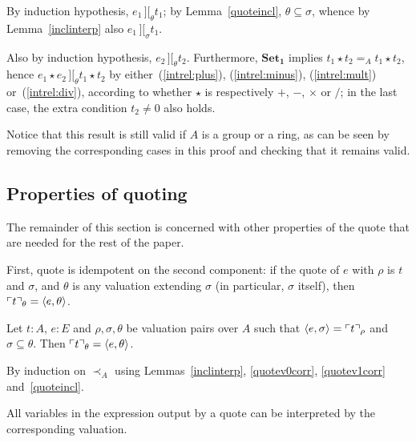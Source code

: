 \documentclass[numreferences]{kluwer}
\newcommand{\intII}{\,]\![}
\newcommand{\less}{\mathrel{\prec_A}}
\newcommand{\axiom}[1]{\ensuremath{\mathbf{#1}}}
\newcommand{\mlfn}[2]{\ensuremath\ulcorner{#1}\urcorner_{#2}}
\newcommand{\intrels}{\mathbin{\intII_{\sigma}}}
\newcommand{\intrelt}{\mathbin{\intII_{\theta}}}
\begin{document}
\begin{article}
\begin{pf}
\begin{enumerate}
By induction hypothesis, $e_1\intrelt t_1$; by Lemma~\ref{quoteincl},
$\theta\subseteq\sigma$, whence by Lemma~\ref{inclinterp} also
$e_1\intrels t_1$.

Also by induction hypothesis, $e_2\intrelt t_2$.  Furthermore,
\axiom{Set_1} implies $t_1\star t_2=_A t_1\star t_2$, hence $e_1\star
e_2\intrelt t_1\star t_2$ by either~(\ref{intrel:plus}),
(\ref{intrel:minus}), (\ref{intrel:mult}) or~(\ref{intrel:div}),
according to whether $\star$ is respectively $+$, $-$, $\times$ or
$/$; in the last case, the extra condition $t_2\neq 0$ also holds.
\end{enumerate}
\end{pf}

Notice that this result is still valid if $A$ is a group or
a ring, as can be seen by removing the corresponding cases in this proof
and checking that it remains valid.

\subsection{Properties of quoting}

The remainder of this section is concerned with other properties of
the quote that are needed for the rest of the paper.

First, quote is idempotent on the second component: if the quote of $e$ with
$\rho$ is $t$ and $\sigma$, and $\theta$ is any valuation extending
$\sigma$ (in particular, $\sigma$ itself), then
$\mlfn{t}{\theta}=\langle e,\theta\rangle$.

\begin{lemma}\label{quoteidempotent}
Let $t:A$, $e:E$ and $\rho,\sigma,\theta$ be valuation pairs over $A$
such that $\langle e,\sigma\rangle=\mlfn{t}{\rho}$ and $\sigma\subseteq\theta$.
Then $\mlfn{t}{\theta}=\langle e,\theta\rangle$.
\end{lemma}
\begin{pf} By induction on $\less$ using Lemmas~\ref{inclinterp},
\ref{quotev0corr}, \ref{quotev1corr} and~\ref{quoteincl}.
\end{pf}

All variables in the expression output by a quote can be
interpreted by the corresponding valuation.


\end{article}
\end{document}
